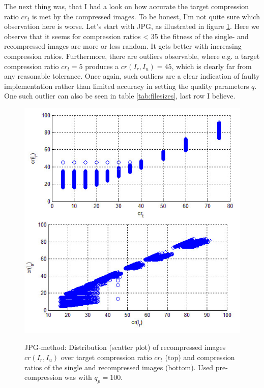 \documentclass[10pt,twocolumn,letterpaper]{article}
\begin{document}
The next thing was, that I had a look on how accurate the target compression ratio $cr_t$ is met by the compressed images. To be honest, I'm not quite sure which observation here is worse. Let's start with JPG, as illustrated in figure \ref{fig:jpgStrange}. Here we observe that it seems for compression ratios < 35 the fitness of the single- and recompressed images are more or less random. It gets better with increasing compression ratios. Furthermore, there are outliers observable, where e.g. a target compression ratio $cr_t=5$ produces a $cr(I_r,I_u)=45$, which is clearly far from any reasonable tolerance. Once again, such outliers are a clear indication of faulty implementation rather than limited accuracy in setting the quality parameters $q$. One such outlier can also be seen in table \ref{tab:filesizes}, last row I believe.

\begin{figure}
	\includegraphics[width=\linewidth]{img/jpg_plots.jpg}
	\label{fig:jpgStrange}
	\caption{JPG-method: Distribution (scatter plot) of recompressed images $cr(I_r, I_u)$ over target compression ratio $cr_t$ (top) and compression ratios of the single and recompressed images (bottom). Used pre-compression was with $q_p=100$. }
\end{figure}
\end{document}
